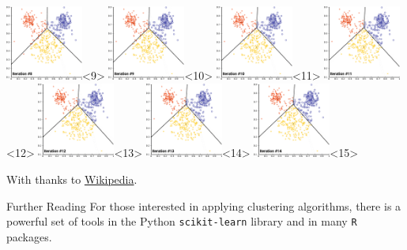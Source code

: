 \documentclass[colorlinks=true,linkcolor=blue]{beamer}
\begin{document}
\begin{frame}
\begin{center}
    \includegraphics[width=1in]{../png/kmeans/kmeans-8.png}<9>%
    \includegraphics[width=1in]{../png/kmeans/kmeans-9.png}<10>%
   \includegraphics[width=1in]{../png/kmeans/kmeans-10.png}<11>%
   \includegraphics[width=1in]{../png/kmeans/kmeans-11.png}<12>%
    \includegraphics[width=1in]{../png/kmeans/kmeans-12.png}<13>%
    \includegraphics[width=1in]{../png/kmeans/kmeans-13.png}<14>%
    \includegraphics[width=1in]{../png/kmeans/kmeans-14.png}<15>%
  \end{center}
With thanks to \href{https://en.wikipedia.org/wiki/K-means_clustering}{Wikipedia}.
\end{frame}
\begin{frame}{Further Reading}
  For those interested in applying clustering algorithms, there is a powerful set of tools in the Python
  \texttt{scikit-learn} library and in  many \texttt{R} packages.
  \end{frame}
  
\end{document}
